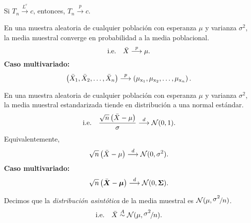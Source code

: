 \documentclass[8pt,a4paper]{extarticle}
\begin{document}
\begin{multicols}{3}
	\begin{boxcor}
		Si $T_n \overset{L^r}{\longrightarrow} c$, entonces, $T_n \overset{p}{\longrightarrow} c$.
	\end{boxcor}

	\begin{boxtheo}
		En una muestra aleatoria de cualquier población con esperanza $\mu$ y varianza $\sigma^2$, la media muestral converge en probabilidad a la media poblacional.
		\[\text{\normalfont i.e.} \quad \bar{X} \overset{p}{\longrightarrow} \mu.\]
		\textbf{Caso multivariado:}
		\[\left( \bar{X}_1, \bar{X}_2, \dots, \bar{X}_n \right) \overset{p}{\longrightarrow} \left( \mu_{\mathrm{x}_1}, \mu_{\mathrm{x}_2}, \dots, \mu_{\mathrm{x}_n} \right).\]
	\end{boxtheo}

	\begin{boxtheo}
		En una muestra aleatoria de cualquier población con esperanza $\mu$ y varianza $\sigma^2$, la media muestral estandarizada tiende en distribución a una normal estándar.
		\[\text{\normalfont i.e.} \quad \frac{\sqrt{n}\left( \bar{X} - \mu \right)}{\sigma} \overset{d}{\longrightarrow} \mathcal{N}(0,1).\]
		Equivalentemente,
		\[\sqrt{n}\left( \bar{X} - \mu \right) \overset{d}{\longrightarrow} \mathcal{N}(0,\sigma^2).\]
		\textbf{Caso multivariado:}
		\[\sqrt{n} \left( \bar{\bm X} - {\bm \mu} \right) \overset{d}{\longrightarrow} \mathcal{N}(0,{\bm \Sigma}) .\]
	\end{boxtheo}

	\begin{boxprop}
		Decimos que la \emph{distribución asintótica} de la media muestral es $\mathcal{N}(\mu,\nicefrac{\displaystyle\sigma^2}{\displaystyle n})$.
		\[\text{\normalfont i.e.} \quad \bar{X} \overset{A}{\sim} \mathcal{N}(\mu,\nicefrac{\displaystyle\sigma^2}{\displaystyle n}).\]
	\end{boxprop}


\end{multicols}
\end{document}
